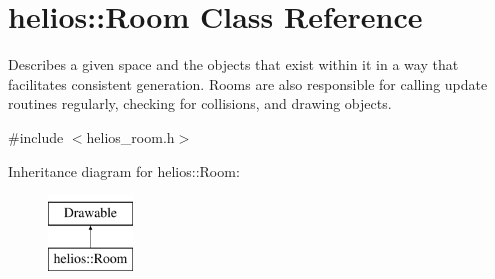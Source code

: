 \hypertarget{classhelios_1_1_room}{}\section{helios\+:\+:Room Class Reference}
\label{classhelios_1_1_room}


Describes a given space and the objects that exist within it in a way that facilitates consistent generation. Rooms are also responsible for calling update routines regularly, checking for collisions, and drawing objects.  




{\ttfamily \#include $<$helios\+\_\+room.\+h$>$}

Inheritance diagram for helios\+:\+:Room\+:\begin{figure}[H]
\begin{center}
\leavevmode
\includegraphics[height=2.000000cm]{classhelios_1_1_room}
\end{center}
\end{figure}
